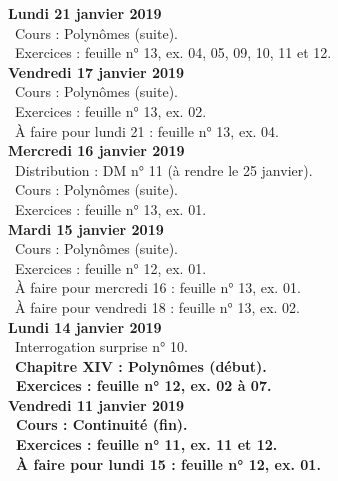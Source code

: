 \documentclass[12pt,a4paper]{article}
\begin{document}
\noindent\textbf{Lundi 21 janvier 2019} \\
\bu\ Cours : Polynômes (suite).\\
\bu\ Exercices : feuille n° 13, ex. 04, 05, 09, 10, 11 et 12.\vspace{.4cm}\\

\noindent\textbf{Vendredi 17 janvier 2019}\\
\bu\ Cours : Polynômes (suite).\\
\bu\ Exercices : feuille n° 13, ex. 02.\\
\bu\ À faire pour lundi 21 : feuille n° 13, ex. 04.\vspace{.4cm}\\

\noindent\textbf{Mercredi 16 janvier 2019} \\
\bu\ Distribution : DM n° 11 (à rendre le 25 janvier).\\
\bu\ Cours : Polynômes (suite).\\
\bu\ Exercices : feuille n° 13, ex. 01.\vspace{.4cm}\\

\noindent\textbf{Mardi 15 janvier 2019} \\
\bu\ Cours : Polynômes (suite).\\
\bu\ Exercices : feuille n° 12, ex. 01.\\
\bu\ À faire pour mercredi 16 : feuille n° 13, ex. 01.\\
\bu\ À faire pour vendredi 18 : feuille n° 13, ex. 02.\vspace{.4cm}\\
 
\noindent\textbf{Lundi 14 janvier 2019} \\
\bu\ Interrogation surprise n° 10.\\
\bu\ \bf Chapitre XIV \rm : Polynômes (début).\\
\bu\ Exercices : feuille n° 12, ex. 02 à 07.\vspace{.4cm}\\

\noindent\textbf{Vendredi 11 janvier 2019}\\
\bu\ Cours : Continuité (fin).\\
\bu\ Exercices : feuille n° 11, ex. 11 et 12.\\
\bu\ À faire pour lundi 15 : feuille n° 12, ex. 01.\vspace{.4cm}\\
 
\end{document}

